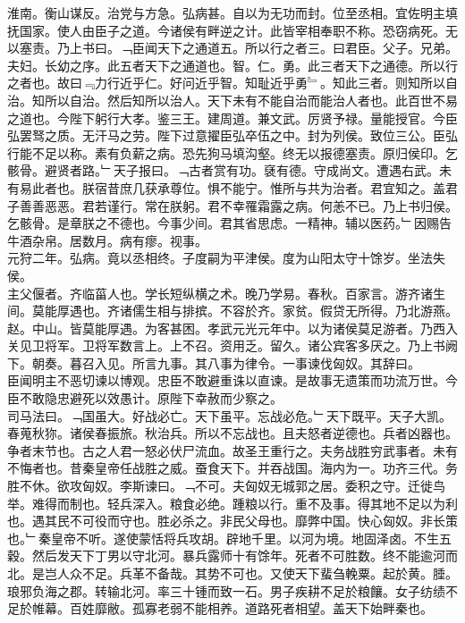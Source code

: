 \documentclass{zhvt-classic}
\begin{document}
\hspace*{2em}淮南。衡山谋反。治党与方急。弘病甚。自以为无功而封。位至丞相。宜佐明主填抚国家。使人由臣子之道。今诸侯有畔逆之计。此皆宰相奉职不称。恐窃病死。无以塞责。乃上书曰。﹁臣闻天下之通道五。所以行之者三。曰君臣。父子。兄弟。夫妇。长幼之序。此五者天下之通道也。智。仁。勇。此三者天下之通德。所以行之者也。故曰﹃力行近乎仁。好问近乎智。知耻近乎勇﹄。知此三者。则知所以自治。知所以自治。然后知所以治人。天下未有不能自治而能治人者也。此百世不易之道也。今陛下躬行大孝。鉴三王。建周道。兼文武。厉贤予禄。量能授官。今臣弘罢驽之质。无汗马之劳。陛下过意擢臣弘卒伍之中。封为列侯。致位三公。臣弘行能不足以称。素有负薪之病。恐先狗马填沟壑。终无以报德塞责。原归侯印。乞骸骨。避贤者路。﹂天子报曰。﹁古者赏有功。褎有德。守成尚文。遭遇右武。未有易此者也。朕宿昔庶几获承尊位。惧不能宁。惟所与共为治者。君宜知之。盖君子善善恶恶。君若谨行。常在朕躬。君不幸罹霜露之病。何恙不已。乃上书归侯。乞骸骨。是章朕之不德也。今事少间。君其省思虑。一精神。辅以医药。﹂因赐告牛酒杂帛。居数月。病有瘳。视事。\\
\hspace*{2em}元狩二年。弘病。竟以丞相终。子度嗣为平津侯。度为山阳太守十馀岁。坐法失侯。\\
\hspace*{2em}主父偃者。齐临菑人也。学长短纵横之术。晚乃学易。春秋。百家言。游齐诸生间。莫能厚遇也。齐诸儒生相与排摈。不容於齐。家贫。假贷无所得。乃北游燕。赵。中山。皆莫能厚遇。为客甚困。孝武元光元年中。以为诸侯莫足游者。乃西入关见卫将军。卫将军数言上。上不召。资用乏。留久。诸公宾客多厌之。乃上书阙下。朝奏。暮召入见。所言九事。其八事为律令。一事谏伐匈奴。其辞曰。\\
\hspace*{2em}臣闻明主不恶切谏以博观。忠臣不敢避重诛以直谏。是故事无遗策而功流万世。今臣不敢隐忠避死以效愚计。原陛下幸赦而少察之。\\
\hspace*{2em}司马法曰。﹁国虽大。好战必亡。天下虽平。忘战必危。﹂天下既平。天子大凯。春蒐秋狝。诸侯春振旅。秋治兵。所以不忘战也。且夫怒者逆德也。兵者凶器也。争者末节也。古之人君一怒必伏尸流血。故圣王重行之。夫务战胜穷武事者。未有不悔者也。昔秦皇帝任战胜之威。蚕食天下。并吞战国。海内为一。功齐三代。务胜不休。欲攻匈奴。李斯谏曰。﹁不可。夫匈奴无城郭之居。委积之守。迁徙鸟举。难得而制也。轻兵深入。粮食必绝。踵粮以行。重不及事。得其地不足以为利也。遇其民不可役而守也。胜必杀之。非民父母也。靡弊中国。快心匈奴。非长策也。﹂秦皇帝不听。遂使蒙恬将兵攻胡。辟地千里。以河为境。地固泽卤。不生五穀。然后发天下丁男以守北河。暴兵露师十有馀年。死者不可胜数。终不能逾河而北。是岂人众不足。兵革不备哉。其势不可也。又使天下蜚刍輓粟。起於黄。腄。琅邪负海之郡。转输北河。率三十锺而致一石。男子疾耕不足於粮饟。女子纺绩不足於帷幕。百姓靡敝。孤寡老弱不能相养。道路死者相望。盖天下始畔秦也。\\
\end{document}
